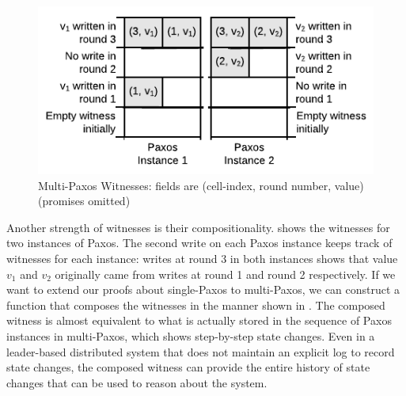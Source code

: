 \begin{figure}
\begin{center}
	\includegraphics[page=2]{figs/witnesspassing/witnessspmp}
\end{center}
	\vspace{-0.2in}
\caption{Multi-Paxos Witnesses: fields are (cell-index, round number, value) (promises omitted)}
\label{fig:multipaxos-witness-table}
\vspace{-1em}
\end{figure}

Another strength of witnesses is their compositionality.
 shows the witnesses for two instances of Paxos.
The second write on each Paxos instance keeps track of witnesses for each
instance: writes at round 3 in both instances shows that value $v_{1}$ and
$v_{2}$ originally came from writes at round 1 and round 2 respectively. 
If we want to extend our proofs about single-Paxos to multi-Paxos, we can construct
a function that composes the witnesses in the manner shown in .
The composed witness is almost equivalent to what is actually stored in the sequence of
Paxos instances in multi-Paxos, which shows step-by-step state changes.
Even in a leader-based distributed system that does not maintain an explicit log 
to record state changes, the composed witness can provide the entire history of
state changes that can be used to reason about the system. 

